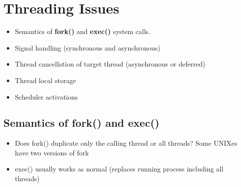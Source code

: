 \documentclass{book}
\begin{document}
        \section{Threading Issues}
            \begin{itemize}
                \item Semantics of \textbf{fork()} and \textbf{exec()} system calls.
                \item Signal handling (synchronous and asynchronous)
                \item Thread cancellation of target thread (asynchronous or deferred)
                \item Thread local storage
                \item Scheduler activations
            \end{itemize}
            \subsection{Semantics of fork() and exec()}
                \begin{itemize}
                    \item Does fork() duplicate only the calling thread or all threads?
                        \subitem Some UNIXes have two versions of fork
                    \item exec() usually works as normal (replaces running process including all threads)
                \end{itemize}
\end{document}
